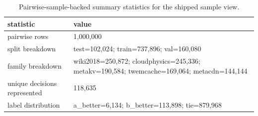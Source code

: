 \begin{table}[t]
  \centering
  \footnotesize
  \caption{Pairwise-sample-backed summary statistics for the shipped sample view.}
  \label{tab:pairwise-sample-stats}
  \begin{tabularx}{\columnwidth}{@{}P{0.34\columnwidth}L@{}}
    \toprule
    statistic & value \\
    \midrule
    pairwise rows & 1,000,000 \\
    split breakdown & test=102,024; train=737,896; val=160,080 \\
    family breakdown & wiki2018=250,872; cloudphysics=245,336;\newline
    metakv=190,584; twemcache=169,064;\newline
    metacdn=144,144 \\
    unique decisions represented & 118,635 \\
    label distribution & a\_better=6,134; b\_better=113,898;\newline
    tie=879,968 \\
    \bottomrule
  \end{tabularx}
\end{table}
